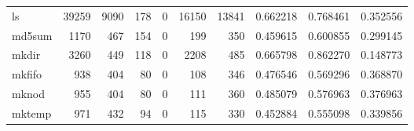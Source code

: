 \begin{tabular}{lrrrrrrrrr}
ls        &                               39259 &                                            9090 &                                            178 &                                             0 &                                          16150 &                                        13841 &                                           0.662218 &                               0.768461 &                             0.352556 \\
md5sum    &                                1170 &                                             467 &                                            154 &                                             0 &                                            199 &                                          350 &                                           0.459615 &                               0.600855 &                             0.299145 \\
mkdir     &                                3260 &                                             449 &                                            118 &                                             0 &                                           2208 &                                          485 &                                           0.665798 &                               0.862270 &                             0.148773 \\
mkfifo    &                                 938 &                                             404 &                                             80 &                                             0 &                                            108 &                                          346 &                                           0.476546 &                               0.569296 &                             0.368870 \\
mknod     &                                 955 &                                             404 &                                             80 &                                             0 &                                            111 &                                          360 &                                           0.485079 &                               0.576963 &                             0.376963 \\
mktemp    &                                 971 &                                             432 &                                             94 &                                             0 &                                            115 &                                          330 &                                           0.452884 &                               0.555098 &                             0.339856 \\

\end{tabular}
